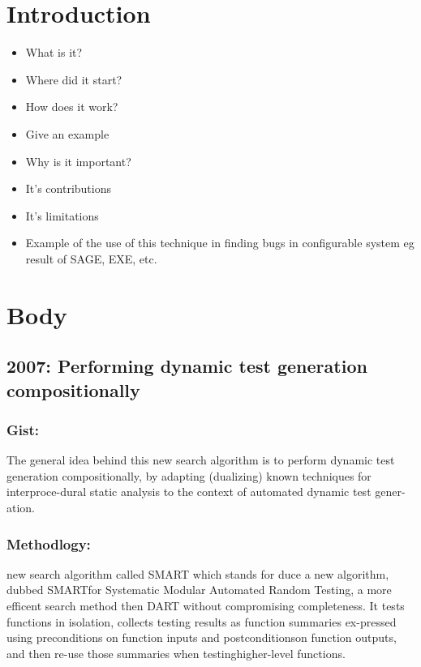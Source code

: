 \documentclass[	runningheads,
				a4paper]{llncs}
\begin{document}
\section{Introduction}
\begin{itemize}
	\item What is it?
	\item Where did it start?
	\item How does it work?
	\item Give an example
	\item Why is it important?
	\item It's contributions
	\item It's limitations
	\item Example of the use of this technique in finding bugs in configurable system eg result of SAGE, EXE, etc.
\end{itemize}


\section{Body}

\subsection{2007: Performing dynamic test generation compositionally}
\cite[paper]{godefroid2007compositional}

\subsubsection{Gist:}
The general idea behind this new search algorithm is to perform dynamic  test generation compositionally, by adapting (dualizing) known techniques for interproce-dural static analysis to the context of automated dynamic test gener-ation.

\subsubsection{Methodlogy:}
new search algorithm called SMART which stands for duce a new algorithm, dubbed SMARTfor Systematic Modular Automated Random Testing, a more efficent search method then DART without compromising
completeness. It tests functions in isolation, collects testing results as function summaries ex-pressed using preconditions on function inputs and postconditionson function outputs, and then re-use those summaries when testinghigher-level functions.
\end{document}
